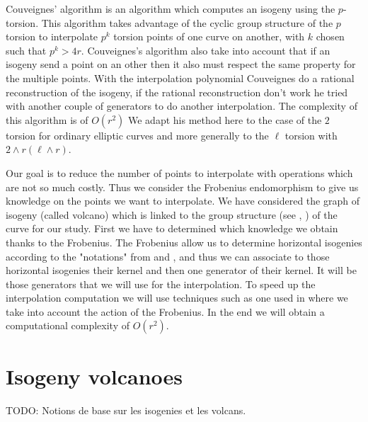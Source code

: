 \documentclass{lms}
\newcommand{\todo}[1]{{\color{red}TODO: #1}}
\begin{document}

Couveignes' algorithm \cite{couveignes96} is an algorithm which computes an isogeny using the $p$-torsion. This algorithm takes advantage of the cyclic group structure of the $p$ torsion to interpolate $p^k$ torsion points of one curve on another, with $k$ chosen such that $p^k>4r$. Couveignes's algorithm also take into account that if an isogeny send a point on an other then it also must respect the same property for the multiple points. With the interpolation polynomial Couveignes do a rational reconstruction of the isogeny, if the rational reconstruction don't work he tried with another couple of generators to do another interpolation. The complexity of this algorithm is of $O(r^2)$
\newline
We adapt his method here to the case of the $2$ torsion for ordinary elliptic curves and more generally to the $\ell$ torsion with $2 \wedge r ( \ell \wedge r)$.

Our goal is to reduce the number of points to interpolate with operations which are not so much costly. Thus we consider the Frobenius endomorphism to give us knowledge on the points we want to interpolate. We have considered the graph of isogeny (called volcano) which is linked to the group structure (see \cite{MiretMRV05}, \cite{IonicaJ10} ) of the curve for our study. First we have to determined which knowledge we obtain thanks to the Frobenius. The Frobenius allow us to determine horizontal isogenies according to the "notations" from \cite{Kohel} and \cite{volcano}, and thus we can associate to those horizontal isogenies their kernel and then one generator of their kernel. It will be those generators that we will use for the interpolation. To speed up the interpolation computation we will use techniques such as one used in \cite{enge+morain03} where we take into account the action of the Frobenius. In the end we will obtain a computational complexity of $O(r^2)$.


\section{Isogeny volcanoes}
\label{sec:isogeny-volcanoes}

\todo{Notions de base sur les isogenies et les volcans.}
\end{document}
